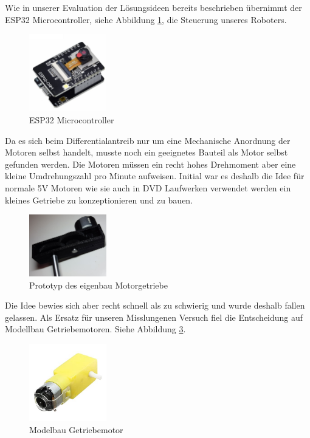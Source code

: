 \begin{flushleft}
    Wie in unserer Evaluation der Lösungsideen bereits beschrieben übernimmt der ESP32 Microcontroller, siehe Abbildung \ref{fig:esp32_mc}, die Steuerung unseres Roboters. 
    
    \begin{figure}[h!]
        \centering
        \includegraphics[width=0.3\textwidth]{imgs/Roboter/Real/esp32.jpg}
        \caption{ESP32 Microcontroller}
        \label{fig:esp32_mc}%
    \end{figure}

    Da es sich beim Differentialantreib nur um eine Mechanische Anordnung der Motoren selbst handelt, musste noch ein
    geeignetes Bauteil als Motor selbst gefunden werden.
    Die Motoren müssen ein recht hohes Drehmoment aber eine kleine Umdrehungszahl pro Minute aufweisen.
    Initial war es deshalb die Idee für normale 5V Motoren wie sie auch in DVD Laufwerken verwendet werden ein kleines
    Getriebe zu konzeptionieren und zu bauen.

    \begin{figure}[h!]
        \centering
        \includegraphics[width=0.3\textwidth]{imgs/Roboter/Real/Getriebe.jpg}
        \caption{Prototyp des eigenbau Motorgetriebe}
        \label{fig:prototyp_transmission}%
    \end{figure}

    Die Idee bewies sich aber recht schnell als zu schwierig und wurde deshalb fallen gelassen.
    Als Ersatz für unseren Misslungenen Versuch fiel die Entscheidung auf Modellbau Getriebemotoren. Siehe Abbildung \ref{fig:robot_motor}.

    \begin{figure}[h!]
        \centering
        \includegraphics[width=0.3\textwidth]{imgs/Roboter/Real/41eJJZ8mOOL._SX342_.jpg}
        \caption{Modelbau Getriebemotor}
        \label{fig:robot_motor}%
    \end{figure}


\end{flushleft}
